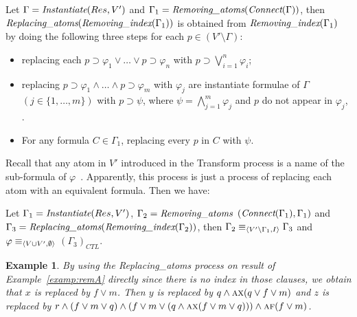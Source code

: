 \documentclass{article}
\newtheorem{example}{Example}
\begin{document}
Let $\Gamma=\emph{Instantiate}(Res, V')$ and $\Gamma_1=\emph{Removing\_atoms} (\emph{Connect}(\Gamma))$, then $\emph{Replacing\_atoms}(\emph{Removing\_index}(\Gamma_1))$ is obtained from $\emph{Removing\_index}(\Gamma_1)$ by doing the following three steps for each $p\in (V'\setminus \Gamma)$:
\begin{itemize}
  \item replacing each $p\supset \varphi_1\vee \dots \vee p \supset \varphi_n$ with $p \supset \bigvee_{i=1}^n \varphi_i$;
  \item replacing $p\supset \varphi_{1}\wedge \dots \wedge p \supset \varphi_{m}$ with $\varphi_j$ are instantiate formulae of  $\Gamma$ $(j \in \{1,\dots, m\})$ with $p \supset \psi$, where $\psi=\bigwedge_{j=1}^{m} \varphi_{j}$ and $p$ do not appear in $\varphi_j$, .
  \item For any formula $C\in \Gamma_1$, replacing every $p$ in $C$ with $\psi$.
\end{itemize}
Recall that any atom in $V'$ introduced in the Transform process is a name of the sub-formula of $\varphi$~\cite{bolotov2000clausal}. Apparently, this process is just a process of replacing each atom with an equivalent formula. Then we have:
\begin{proposition}\label{pro:replaceA}
Let $\Gamma_1=\emph{Instantiate}(Res, V')$, $\Gamma_2 =\emph{Removing\_atoms}$ $(\emph{Connect}(\Gamma_1), \Gamma_1)$ and $\Gamma_3 = \emph{Replacing\_atoms}(\emph{Removing\_index}(\Gamma_2))$, then $\Gamma_2  \equiv_{{\langle{V'\setminus \Gamma_1, I}\rangle}} \Gamma_3$ and $\varphi \equiv_{{\langle{V\cup V', \emptyset}\rangle}}$ $(\Gamma_3)_{CTL}$.
\end{proposition}
%


\begin{example}\label{exa:replace:sub}
By using the \emph{Replacing\_atoms} process on result of Example~\ref{examp:remA} directly since there is no index in those clauses, we obtain that $x$ is replaced by $f\vee m$. Then $y$ is replaced by $q \wedge \textsc{a}\textsc{x}(q \vee f\vee m)$ and $z$ is replaced by $r\wedge (f\vee m \vee q) \wedge (f\vee m \vee (q\wedge \textsc{a}\textsc{x}(f\vee m\vee q))) \wedge \textsc{a}\textsc{f}(f \vee m)$.
\end{example}
\end{document}
